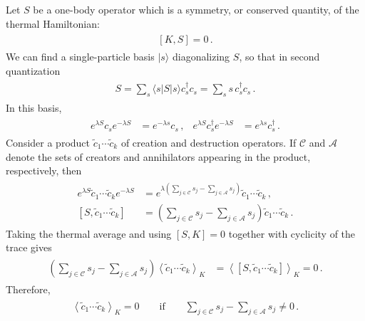 \documentclass[../QFT_main.tex]{subfiles}
\begin{document}
\begin{mytheorem}
Let $S$ be a one-body operator which is a symmetry, or conserved quantity, of the thermal Hamiltonian:
{\small\begin{align}\begin{aligned}
    [K,S]=0\,.
\end{aligned}\end{align}}
We can find a single-particle basis $|s\rangle$ diagonalizing $S$, so that in second quantization
{\small\begin{align}\begin{aligned}
    S=\sum_s\langle s|S|s\rangle c_s^\dagger c_s
    =\sum_s s\,c_s^\dagger c_s\,.
\end{aligned}\end{align}}
In this basis,
{\small\begin{align}\begin{aligned}
    e^{\lambda S}c_s e^{-\lambda S}&=e^{-\lambda s}c_s\,,
    &
    e^{\lambda S}c_s^\dagger e^{-\lambda S}&=e^{\lambda s}c_s^\dagger\,.
\end{aligned}\end{align}}
Consider a product $\widetilde c_1\cdots\widetilde c_k$ of creation and destruction operators.
If $\mathcal C$ and $\mathcal A$ denote the sets of creators and annihilators appearing in the product, respectively, then
{\small\begin{align}\begin{aligned}
    e^{\lambda S}
    \widetilde c_1\cdots\widetilde c_k
    e^{-\lambda S}
    &=
    e^{\lambda\left(\sum_{j\in\mathcal C}s_j-\sum_{j\in\mathcal A}s_j\right)}
    \widetilde c_1\cdots\widetilde c_k\,,
    \\
    [S,\widetilde c_1\cdots\widetilde c_k]
    &=
    \left(\sum_{j\in\mathcal C}s_j-\sum_{j\in\mathcal A}s_j\right)
    \widetilde c_1\cdots\widetilde c_k\,.
\end{aligned}\end{align}}
Taking the thermal average and using $[S,K]=0$ together with cyclicity of the trace gives
{\small\begin{align}\begin{aligned}
    \left(\sum_{j\in\mathcal C}s_j-\sum_{j\in\mathcal A}s_j\right)
    \left\langle\widetilde c_1\cdots\widetilde c_k\right\rangle_K
    &=
    \left\langle[S,\widetilde c_1\cdots\widetilde c_k]\right\rangle_K
    =0\,.
\end{aligned}\end{align}}
Therefore,
{\small\begin{align}\begin{aligned}
    \left\langle\widetilde c_1\cdots\widetilde c_k\right\rangle_K=0
    \qquad\text{if}\qquad
    \sum_{j\in\mathcal C}s_j-\sum_{j\in\mathcal A}s_j\neq0\,.
\end{aligned}\end{align}}


\end{mytheorem}
\end{document}
